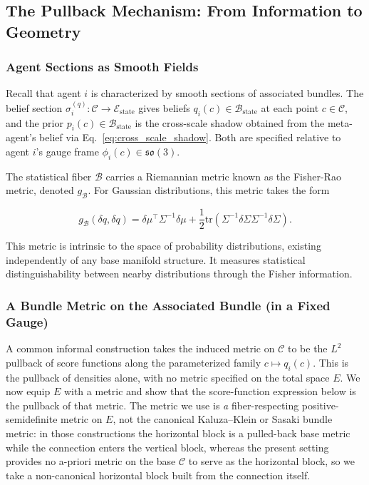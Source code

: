 \documentclass[11pt]{article}
\begin{document}
\subsection{The Pullback Mechanism: From Information to Geometry}

\subsubsection{Agent Sections as Smooth Fields}

Recall that agent $i$ is characterized by smooth sections of associated bundles. The belief section $\sigma_i^{(q)}: \mathcal{C} \to \mathcal{E}_{\mathrm{state}}$ gives beliefs $q_i(c) \in \mathcal{B}_{\mathrm{state}}$ at each point $c \in \mathcal{C}$, and the prior $p_i(c) \in \mathcal{B}_{\mathrm{state}}$ is the cross-scale shadow obtained from the meta-agent's belief via Eq.~\eqref{eq:cross_scale_shadow}. Both are specified relative to agent $i$'s gauge frame $\phi_i(c) \in \mathfrak{so}(3)$.

The statistical fiber $\mathcal{B}$ carries a Riemannian metric known as the Fisher-Rao metric, denoted $g_{\mathcal{B}}$. For Gaussian distributions, this metric takes the form

\begin{equation}
g_{\mathcal{B}}(\delta q, \delta q) = \delta\mu^\top \Sigma^{-1} \delta\mu + \frac{1}{2}\mathrm{tr}(\Sigma^{-1}\delta\Sigma\Sigma^{-1}\delta\Sigma).
\end{equation}

This metric is intrinsic to the space of probability distributions, existing independently of any base manifold structure. It measures statistical distinguishability between nearby distributions through the Fisher information.

\subsubsection{A Bundle Metric on the Associated Bundle (in a Fixed Gauge)}

A common informal construction takes the induced metric on $\mathcal{C}$ to be the $L^2$ pullback of score functions along the parameterized family $c \mapsto q_i(c)$. This is the pullback of densities alone, with no metric specified on the total space $E$. We now equip $E$ with a metric and show that the score-function expression below is the pullback of that metric. The metric we use is \emph{a} fiber-respecting positive-semidefinite metric on $E$, not the canonical Kaluza--Klein or Sasaki bundle metric: in those constructions the horizontal block is a pulled-back base metric while the connection enters the vertical block, whereas the present setting provides no a-priori metric on the base $\mathcal{C}$ to serve as the horizontal block, so we take a non-canonical horizontal block built from the connection itself.
\end{document}

